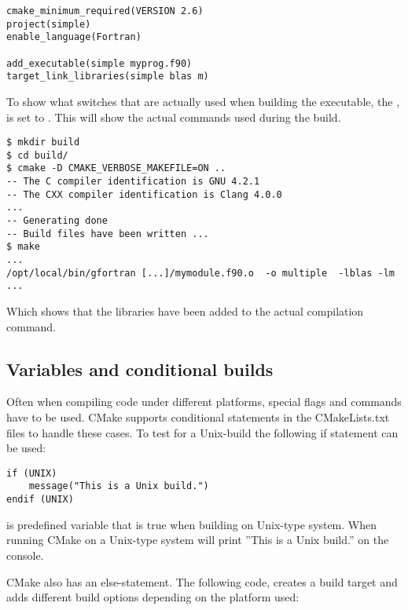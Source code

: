 \cmmode

\begin{lstlisting}
cmake_minimum_required(VERSION 2.6)
project(simple)
enable_language(Fortran)

add_executable(simple myprog.f90)
target_link_libraries(simple blas m)
\end{lstlisting}

To show what switches that are actually used when building the executable, the , is set to . This will show the actual commands used during the build.

\cmdmode

\begin{lstlisting}
$ mkdir build
$ cd build/
$ cmake -D CMAKE_VERBOSE_MAKEFILE=ON ..
-- The C compiler identification is GNU 4.2.1
-- The CXX compiler identification is Clang 4.0.0
...
-- Generating done
-- Build files have been written ...
$ make
...
/opt/local/bin/gfortran [...]/mymodule.f90.o  -o multiple  -lblas -lm 
...
\end{lstlisting}

Which shows that the libraries have been added to the actual compilation command.

\subsection{Variables and conditional builds}

Often when compiling code under different platforms, special flags and commands have to be used. CMake supports conditional statements in the CMakeLists.txt files to handle these cases. To test for a Unix-build the following if statement can be used:

\cmmode

\begin{lstlisting}
if (UNIX)
	message("This is a Unix build.")
endif (UNIX)
\end{lstlisting}

 is predefined variable that is true when building on Unix-type system. When running CMake on a Unix-type system will print ''This is a Unix build.'' on the console.

CMake also has an else-statement. The following code, creates a build target and adds different build options depending on the platform used:

